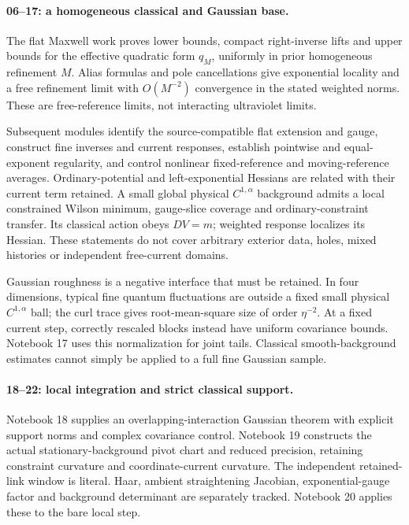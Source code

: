 \paragraph{06--17: a homogeneous classical and Gaussian base.}
The flat Maxwell work proves lower bounds,
compact right-inverse lifts and upper bounds for
the effective quadratic form \(q_M\), uniformly
in prior homogeneous refinement \(M\).
Alias formulas and pole cancellations give
exponential locality and a free refinement
limit with \(O(M^{-2})\) convergence in the
stated weighted norms. These are free-reference
limits, not interacting ultraviolet limits.

Subsequent modules identify the source-compatible
flat extension and gauge, construct fine inverses
and current responses, establish pointwise and
equal-exponent regularity, and control nonlinear
fixed-reference and moving-reference averages.
Ordinary-potential and left-exponential Hessians
are related with their current term retained.
A small global physical \(C^{1,\alpha}\)
background admits a local constrained Wilson
minimum, gauge-slice coverage and ordinary-constraint
transfer. Its classical action obeys \(DV=m\);
weighted response localizes its Hessian.
These statements do not cover arbitrary exterior
data, holes, mixed histories or independent
free-current domains.

Gaussian roughness is a negative interface
that must be retained. In four dimensions,
typical fine quantum fluctuations are outside
a fixed small physical \(C^{1,\alpha}\) ball;
the curl trace gives root-mean-square size
of order \(\eta^{-2}\). At a fixed current
step, correctly rescaled blocks instead
have uniform covariance bounds. Notebook 17
uses this normalization for joint tails.
Classical smooth-background estimates cannot
simply be applied to a full fine Gaussian sample.

\paragraph{18--22: local integration and strict classical support.}
Notebook 18 supplies an overlapping-interaction
Gaussian theorem with explicit support norms
and complex covariance control. Notebook 19
constructs the actual stationary-background
pivot chart and reduced precision, retaining
constraint curvature and coordinate-current
curvature. The independent retained-link
window is literal. Haar, ambient straightening
Jacobian, exponential-gauge factor and
background determinant are separately tracked.
Notebook 20 applies these to the bare local step.

